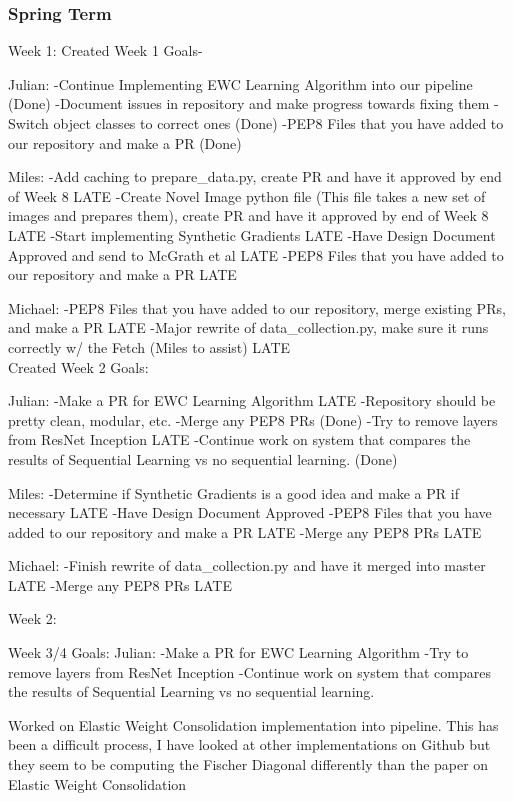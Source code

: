 \documentclass[draftclsnofoot, onecolumn, 10pt, compsoc]{IEEEtran}
\begin{document}
  \subsubsection{Spring Term}
  Week 1: 
  Created Week 1 Goals-

  Julian:
  -Continue Implementing EWC Learning Algorithm into our pipeline (Done)
  -Document issues in repository and make progress towards fixing them
  -Switch object classes to correct ones (Done)
  -PEP8 Files that you have added to our repository and make a PR (Done)

  Miles:
  -Add caching to prepare\_data.py, create PR and have it approved by end of Week 8 LATE
  -Create Novel Image python file (This file takes a new set of images and prepares them), create PR and have it approved by end of Week 8 LATE
  -Start implementing Synthetic Gradients LATE
  -Have Design Document Approved and send to McGrath et al LATE
  -PEP8 Files that you have added to our repository and make a PR LATE

  Michael:
  -PEP8 Files that you have added to our repository, merge existing PRs, and make a PR LATE
  -Major rewrite of data\_collection.py, make sure it runs correctly w/ the Fetch (Miles to assist) LATE
  \\ \indent Created Week 2 Goals:

  Julian:
  -Make a PR for EWC Learning Algorithm LATE
  -Repository should be pretty clean, modular, etc.
  -Merge any PEP8 PRs (Done)
  -Try to remove layers from ResNet Inception LATE
  -Continue work on system that compares the results of Sequential Learning vs no sequential learning. (Done)

  Miles:
  -Determine if Synthetic Gradients is a good idea and make a PR if necessary LATE
  -Have Design Document Approved 
  -PEP8 Files that you have added to our repository and make a PR LATE
  -Merge any PEP8 PRs LATE

  Michael:
  -Finish rewrite of data\_collection.py and have it merged into master LATE
  -Merge any PEP8 PRs LATE


Week 2:

  Week 3/4 Goals:
  Julian:
  -Make a PR for EWC Learning Algorithm 
  -Try to remove layers from ResNet Inception
  -Continue work on system that compares the results of Sequential Learning    	 vs no sequential learning.

  Worked on Elastic Weight Consolidation implementation into pipeline. This has been a difficult process, I have looked at other implementations on Github but they seem to be computing the Fischer Diagonal differently than the paper on Elastic Weight Consolidation
\end{document}
